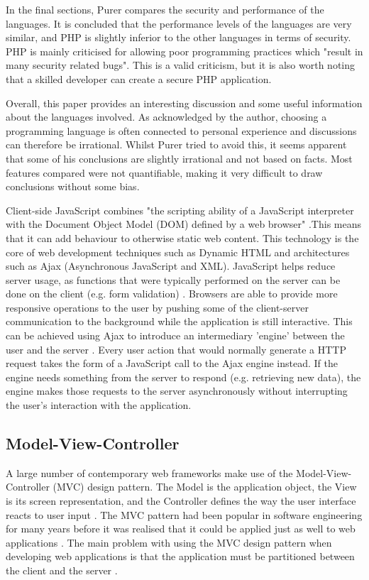 \documentclass[authoryearcitations]{UoYCSproject}
\begin{document}
In the final sections, Purer compares the security and performance of the languages. It is concluded that the performance levels of the languages are very similar, and PHP is slightly inferior to the other languages in terms of security. PHP is mainly criticised for allowing poor programming practices which "result in many security related bugs". This is a valid criticism, but it is also worth noting that a skilled developer can create a secure PHP application. 

Overall, this paper provides an interesting discussion and some useful information about the languages involved. As acknowledged by the author, choosing a programming language is often connected to personal experience and discussions can therefore be irrational. Whilst Purer tried to avoid this, it seems apparent that some of his conclusions are slightly irrational and not based on facts. Most features compared were not quantifiable, making it very difficult to draw conclusions without some bias.

Client-side JavaScript combines "the scripting ability of a JavaScript interpreter with the Document Object Model (DOM) defined by a web browser" \citep{Flanagan2006a}.This means that it can add behaviour to otherwise static web content. This technology is the core of web development techniques such as Dynamic HTML and architectures such as Ajax (Asynchronous JavaScript and XML). JavaScript helps reduce server usage, as functions that were typically performed on the server can be done on the client (e.g. form validation) \citep{Jazayeri2007}. Browsers are able to provide more responsive operations to the user by pushing some of the client-server communication to the background while the application is still interactive. This can be achieved using Ajax to introduce an intermediary 'engine' between the user and the server \citep{Garrett2005}. Every user action that would normally generate a HTTP request takes the form of a JavaScript call to the Ajax engine instead. If the engine needs something from the server to respond (e.g. retrieving new data), the engine makes those requests to the server asynchronously without interrupting the user's interaction with the application. 


\subsection{Model-View-Controller}

A large number of contemporary web frameworks make use of the Model-View-Controller (MVC) design pattern. The Model is the application object, the View is its screen representation, and the Controller defines the way the user interface reacts to user input \citep{Gamma1995}. The MVC pattern had been popular in software engineering for many years before it was realised that it could be applied just as well to web applications \citep{Jazayeri2007}.  The main problem with using the MVC design pattern when developing web applications is that the application must be partitioned between the client and the server \citep{Leff2001}.
\end{document}
